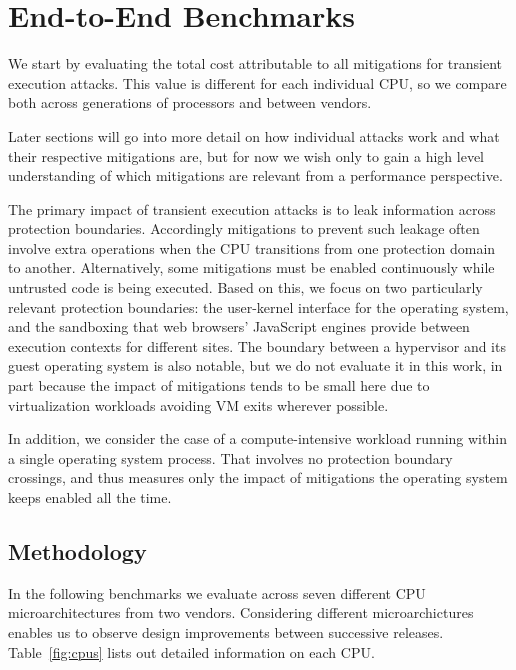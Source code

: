 \section{End-to-End Benchmarks}
\label{s:benchmarks}

We start by evaluating the total cost attributable to all mitigations for transient execution attacks.
This value is different for each individual CPU, so we compare both across generations of processors and between vendors.

Later sections will go into more detail on how individual attacks work and what their respective mitigations are, but for now we wish only to gain a high level understanding of which mitigations are relevant from a performance perspective.

The primary impact of transient execution attacks is to leak information across protection boundaries.
Accordingly mitigations to prevent such leakage often involve extra operations when the CPU transitions from one protection domain to another.
Alternatively, some mitigations must be enabled continuously while untrusted code is being executed.
Based on this, we focus on two particularly relevant protection boundaries: the user-kernel interface for the operating system, and the sandboxing that web browsers' JavaScript engines provide between execution contexts for different sites.
The boundary between a hypervisor and its guest operating system is also notable, but we do not evaluate it in this work, in part because the impact of mitigations tends to be small here due to virtualization workloads avoiding VM exits wherever possible.

In addition, we consider the case of a compute-intensive workload running within a single operating system process.
That involves no protection boundary crossings, and thus measures only the impact of mitigations the operating system keeps enabled all the time.

\subsection{Methodology}
In the following benchmarks we evaluate across seven different CPU microarchitectures from two vendors.
Considering different microarchictures enables us to observe design improvements between successive releases.
Table~\ref{fig:cpus} lists out detailed information on each CPU.

